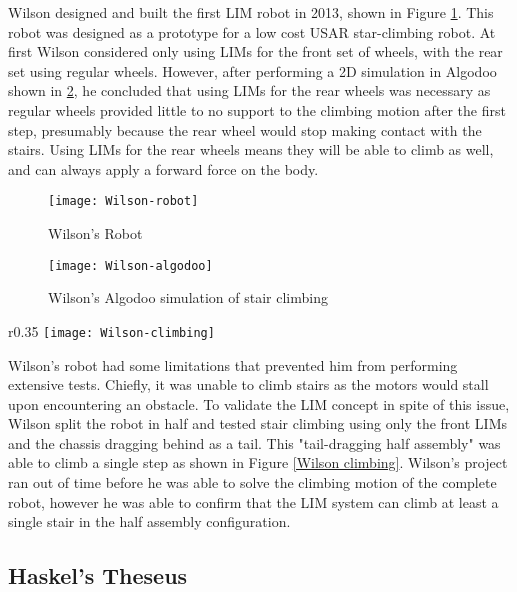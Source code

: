 Wilson designed and built the first LIM robot in 2013, shown in Figure \ref{Wilson robot}. This robot was designed as a prototype for a low cost USAR star-climbing robot. At first Wilson considered only using LIMs for the front set of wheels, with the rear set using regular wheels. However, after performing a 2D simulation in Algodoo shown in \ref{Wilson algodoo}, he concluded that using LIMs for the rear wheels was necessary as regular wheels provided little to no support to the climbing motion after the first step, presumably because the rear wheel would stop making contact with the stairs. Using LIMs for the rear wheels means they will be able to climb as well, and can always apply a forward force on the body.

\begin{figure}[h]
	\centering
	\texttt{[image: Wilson-robot]}
	\caption{Wilson's Robot \citep{Wilson-2013}}
	\label{Wilson robot}
\end{figure}

\begin{figure}[h]
	\centering
	\texttt{[image: Wilson-algodoo]}
	\caption{Wilson's Algodoo simulation of stair climbing \citep{Wilson-2013}}
	\label{Wilson algodoo}
\end{figure}

\begin{wrapfigure}{r}{0.35\textwidth} %
	\centering
	\texttt{[image: Wilson-climbing]}
	\caption{Wilson's half assembly climbing a stair \citep{Wilson-2013}}
	\label{Wilson climbing}
\end{wrapfigure}

Wilson's robot had some limitations that prevented him from performing extensive tests. Chiefly, it was unable to climb stairs as the motors would stall upon encountering an obstacle. To validate the LIM concept in spite of this issue, Wilson split the robot in half and tested stair climbing using only the front LIMs and the chassis dragging behind as a tail. This "tail-dragging half assembly" was able to climb a single step as shown in Figure \ref{Wilson climbing}. Wilson's project ran out of time before he was able to solve the climbing motion of the complete robot, however he was able to confirm that the LIM system can climb at least a single stair in the half assembly configuration.

\subsection{Haskel's Theseus} %

